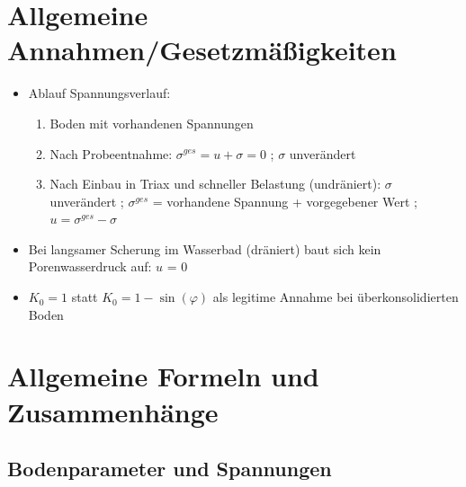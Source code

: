 \documentclass[fleqn,twoside]{article}
\begin{document}
\section{Allgemeine Annahmen/Gesetzmäßigkeiten}



\begin{itemize}
\item Ablauf Spannungsverlauf:
	\begin{enumerate}
		\item Boden mit vorhandenen Spannungen
		\item Nach Probeentnahme: $\sigma^{ges}=u+\sigma = 0$ ; $\sigma$ unverändert
		\item Nach Einbau in Triax und schneller Belastung (undräniert): $\sigma$ unverändert ; $\sigma^{ges}$ = vorhandene Spannung + vorgegebener Wert ; $u=\sigma^{ges}-\sigma$
		\end{enumerate}
\item Bei langsamer Scherung im Wasserbad (dräniert) baut sich kein Porenwasserdruck auf: $u$ = 0
\item $K_0 = 1$ statt $K_0=1-\sin(\varphi)$ als legitime Annahme bei überkonsolidierten Boden 
\end{itemize}

\section{Allgemeine Formeln und Zusammenhänge}

\subsection{Bodenparameter und Spannungen}
\end{document}
